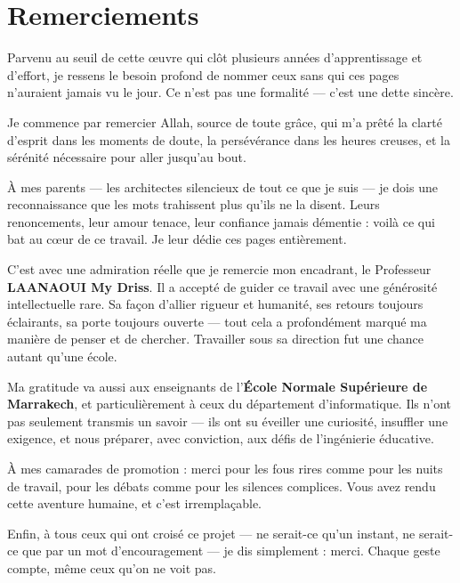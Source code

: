 \chapter*{Remerciements}

Parvenu au seuil de cette œuvre qui clôt plusieurs années d'apprentissage et d'effort, je ressens le besoin profond de nommer ceux sans qui ces pages n'auraient jamais vu le jour. Ce n'est pas une formalité --- c'est une dette sincère.

Je commence par remercier Allah, source de toute grâce, qui m'a prêté la clarté d'esprit dans les moments de doute, la persévérance dans les heures creuses, et la sérénité nécessaire pour aller jusqu'au bout.

À mes parents --- les architectes silencieux de tout ce que je suis --- je dois une reconnaissance que les mots trahissent plus qu'ils ne la disent. Leurs renoncements, leur amour tenace, leur confiance jamais démentie : voilà ce qui bat au cœur de ce travail. Je leur dédie ces pages entièrement.

C'est avec une admiration réelle que je remercie mon encadrant, le Professeur \textbf{LAANAOUI My Driss}. Il a accepté de guider ce travail avec une générosité intellectuelle rare. Sa façon d'allier rigueur et humanité, ses retours toujours éclairants, sa porte toujours ouverte --- tout cela a profondément marqué ma manière de penser et de chercher. Travailler sous sa direction fut une chance autant qu'une école.

Ma gratitude va aussi aux enseignants de l'\textbf{École Normale Supérieure de Marrakech}, et particulièrement à ceux du département d'informatique. Ils n'ont pas seulement transmis un savoir --- ils ont su éveiller une curiosité, insuffler une exigence, et nous préparer, avec conviction, aux défis de l'ingénierie éducative.

À mes camarades de promotion : merci pour les fous rires comme pour les nuits de travail, pour les débats comme pour les silences complices. Vous avez rendu cette aventure humaine, et c'est irremplaçable.

Enfin, à tous ceux qui ont croisé ce projet --- ne serait-ce qu'un instant, ne serait-ce que par un mot d'encouragement --- je dis simplement : merci. Chaque geste compte, même ceux qu'on ne voit pas.
